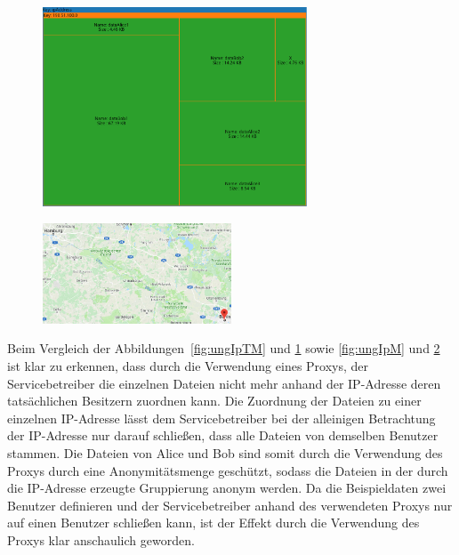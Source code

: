 \documentclass[
    fontsize=12pt,
    headings=small,
    parskip=half,           %
    bibliography=totoc,
    numbers=noenddot,       %
    open=any,               %
    ]{scrreprt}
\begin{document}
\begin{figure}[H]
\includegraphics[width=0.7\textwidth]{../pic/IP-Proxy-SetB-tree3.PNG}
\label{fig:PIpTM}
\end{figure}

\begin{figure}[H]
\includegraphics[width=0.5\textwidth , height=0.2\textheight]{../pic/IP-Proxy-SetB.PNG}
\label{fig:PIpM}
\end{figure}

Beim Vergleich der Abbildungen~\ref{fig:ungIpTM} und \ref{fig:PIpTM} sowie \ref{fig:ungIpM} und \ref{fig:PIpM} ist klar zu erkennen, dass durch die Verwendung eines Proxys, der Servicebetreiber die einzelnen Dateien nicht mehr anhand der IP-Adresse deren tatsächlichen Besitzern zuordnen kann.
Die Zuordnung der Dateien zu einer einzelnen IP-Adresse lässt dem Servicebetreiber bei der alleinigen Betrachtung der IP-Adresse nur darauf schließen, dass alle Dateien von demselben Benutzer stammen.
Die Dateien von Alice und Bob sind somit durch die Verwendung des Proxys durch eine Anonymitätsmenge geschützt, sodass die Dateien in der durch die IP-Adresse erzeugte Gruppierung anonym werden.
Da die Beispieldaten zwei Benutzer definieren und der Servicebetreiber anhand des verwendeten Proxys nur auf einen Benutzer schließen kann, ist der Effekt durch die Verwendung des Proxys klar anschaulich geworden. 
\end{document}
